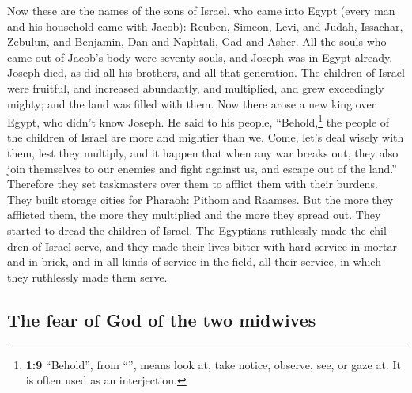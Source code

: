 \begin{paracol}{2}
\begin{otherlanguage}{english}
 Now these are the names of the sons of Israel, who came
into Egypt (every man and his household came with Jacob): 
Reuben, Simeon, Levi, and Judah,  Issachar, Zebulun, and
Benjamin,  Dan and Naphtali, Gad and Asher. 
All the souls who came out of Jacob's body were seventy souls, and
Joseph was in Egypt already.  Joseph died, as did all his
brothers, and all that generation.  The children of Israel
were fruitful, and increased abundantly, and multiplied, and grew
exceedingly mighty; and the land was filled with them. 
Now there arose a new king over Egypt, who didn't know Joseph.
 He said to his people, ``Behold,\footnote{\textbf{1:9}
  ``Behold'', from ``'', means look at, take notice,
  observe, see, or gaze at. It is often used as an interjection.} the
people of the children of Israel are more and mightier than we.
 Come, let's deal wisely with them, lest they multiply,
and it happen that when any war breaks out, they also join themselves to
our enemies and fight against us, and escape out of the land.''
 Therefore they set taskmasters over them to afflict them
with their burdens. They built storage cities for Pharaoh: Pithom and
Raamses.  But the more they afflicted them, the more they
multiplied and the more they spread out. They started to dread the
children of Israel.  The Egyptians ruthlessly made the
children of Israel serve,  and they made their lives
bitter with hard service in mortar and in brick, and in all kinds of
service in the field, all their service, in which they ruthlessly made
them serve.

\hypertarget{the-fear-of-god-of-the-two-midwives}{%
\subsection{The fear of God of the two
midwives}\label{the-fear-of-god-of-the-two-midwives}}


\end{otherlanguage}
\end{paracol}
